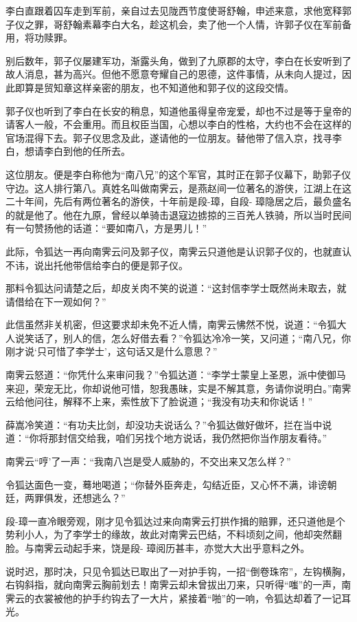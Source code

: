 \documentclass[12pt,oneside]{book}
\begin{document}
李白直跟着囚车走到军前，亲自过去见陇西节度使哥舒翰，申述来意，求他宽释郭子仪之罪，哥舒翰素幕李白大名，趁这机会，卖了他一个人情，许郭子仪在军前备用，将功赎罪。

别后数年，郭子仪屡建军功，渐露头角，做到了九原郡的太守，李白在长安听到了故人消息，甚为高兴。但他不愿意夸耀自己的恩德，这件事情，从未向人提过，因此即算是贸知章这样亲密的朋友，也不知道他和郭子仪的这段交情。

郭子仪也听到了李白在长安的稍息，知道他虽得皇帝宠爱，却也不过是等于皇帝的请客人一般，不会重用。而且权臣当国，心想以李白的性格，大约也不会在这样的官场混得下去。郭子仪思念及此，遂请他的一位朋友。替他带了信入京，找寻李白，想请李白到他的任所去。

这位朋友。便是李白称他为``南八兄''的这个军官，其时正在郭子仪幕下，助郭子仪守边。这人排行第八。真姓名叫做南霁云，是燕赵间一位著名的游侠，江湖上在这二十年间，先后有两位著名的游侠，十年前是段-璋，自段-
璋隐居之后，最负盛名的就是他了。他在九原，曾经以单骑击退寇边掳掠的三百羌人铁骑，所以当时民间有一句赞扬他的话道：``要如南八，方是男儿！''

此际，令狐达一再向南霁云问及郭子仪，南霁云只道他是认识郭子仪的，也就直认不讳，说出托他带信给李白的便是郭子仪。

那料令狐达问请楚之后，却皮关肉不笑的说道：``这封信李学士既然尚未取去，就请借给在下一观如何？''

此信虽然非关机密，但这要求却未免不近人情，南霁云怫然不悦，说道：``令狐大人说笑话了，别人的信，怎么好借去看？''令狐达冷冷一笑，又问道；``南八兄，你刚才说`只可惜了李学士'，这句话又是什么意思？''

南霁云怒道：``你凭什么来审问我？''令狐达道：``李学士蒙皇上圣恩，派中使御马来迎，荣宠无比，你却说他可惜，恕我愚昧，实是不解其意，务请你说明白。''南霁云给他问往，解释不上来，索性放下了脸说道；``我没有功夫和你说话！''

薛嵩冷笑道：``有功夫比剑，却没功夫说话么？''令狐达做好做坏，拦在当中说道：``你将那封信交给我，咱们另找个地方说话，我仍然把你当作朋友看待。''

南霁云``哼'了一声：``我南八岂是受人威胁的，不交出来又怎么样？''

令狐达面色一变，蓦地喝道；``你替外臣奔走，勾结近臣，又心怀不满，诽谤朝廷，两罪俱发，还想逃么？''

段-璋一直冷眼旁观，刚才见令狐达过来向南霁云打拱作揖的赔罪，还只道他是个势利小人，为了李学士的缘故，故此对南霁云巴结，不料顷刻之间，他却突然翻脸。与南霁云动起手来，饶是段-
璋阅历甚丰，亦觉大大出乎意料之外。

说时迟，那时决，只见令狐达已取出了一对护手钩，一招``倒卷珠帘''，左钩横胸，右钩斜指，就向南霁云胸前划去！南霁云却未曾拔出刀来，只听得``嗤''的一声，南霁云的衣裳被他的护手约钩去了一大片，紧接着``啪''的一响，令狐达却着了一记耳光。
\end{document}
